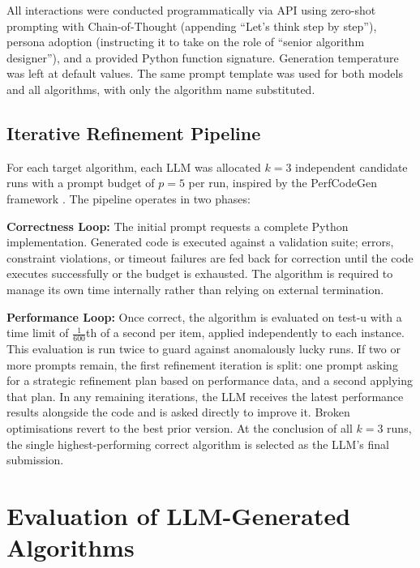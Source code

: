 \documentclass[11pt]{article}
\begin{document}
All interactions were conducted programmatically via API using zero-shot prompting with Chain-of-Thought (appending ``Let's think step by step''), persona adoption (instructing it to take on the role of ``senior algorithm designer''), and a provided Python function signature. Generation temperature was left at default values. The same prompt template was used for both models and all
algorithms, with only the algorithm name substituted.

\subsection{Iterative Refinement Pipeline}

For each target algorithm, each LLM was allocated $k = 3$ independent candidate runs with a prompt budget of $p = 5$ per run, inspired by the PerfCodeGen framework \cite{perfcodegen}. The pipeline operates in two phases:

\textbf{Correctness Loop:} The initial prompt requests a complete Python implementation. Generated code is executed against a validation suite; errors, constraint violations, or timeout failures are fed back for correction until the code executes successfully or the budget is exhausted. The algorithm is required to manage its own time internally rather than relying on external termination.

\textbf{Performance Loop:} Once correct, the algorithm is evaluated on test-u with a time limit of $\frac{1}{600}$th of a second per item, applied independently to each instance. This evaluation is run twice to guard against anomalously lucky runs. If two or more prompts remain, the first refinement iteration is split: one prompt asking for a strategic refinement plan based on performance data, and a second applying that plan. In any remaining iterations, the LLM receives the latest performance results alongside the code and is asked directly to improve it. Broken optimisations revert to the best prior version. At the conclusion of all $k = 3$ runs, the single highest-performing correct algorithm is selected as the LLM's final submission.

\section{Evaluation of LLM-Generated Algorithms} \label{sec:llm-eval}
\end{document}
